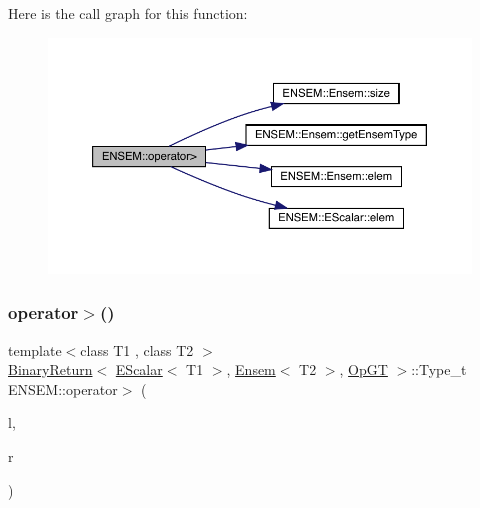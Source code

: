 Here is the call graph for this function\+:\nopagebreak
\begin{figure}[H]
\begin{center}
\leavevmode
\includegraphics[width=350pt]{d1/d9e/group__eensem_gadb5372b36c1e21728de4e36358b59440_cgraph}
\end{center}
\end{figure}
\mbox{\label{group__eensem_gaf81a55e62404e9b802fbb90aaee678ea}} 
\subsubsection{\texorpdfstring{operator$>$()}{operator>()}\hspace{0.1cm}{\footnotesize\ttfamily [3/3]}}
{\footnotesize\ttfamily template$<$class T1 , class T2 $>$ \\
\mbox{\hyperlink{structENSEM_1_1BinaryReturn}{Binary\+Return}}$<$ \mbox{\hyperlink{classENSEM_1_1EScalar}{E\+Scalar}}$<$ T1 $>$, \mbox{\hyperlink{classENSEM_1_1Ensem}{Ensem}}$<$ T2 $>$, \mbox{\hyperlink{structENSEM_1_1OpGT}{Op\+GT}} $>$\+::Type\+\_\+t E\+N\+S\+E\+M\+::operator$>$ (\begin{DoxyParamCaption}\item[{const \mbox{\hyperlink{classENSEM_1_1EScalar}{E\+Scalar}}$<$ T1 $>$ \&}]{l,  }\item[{const \mbox{\hyperlink{classENSEM_1_1Ensem}{Ensem}}$<$ T2 $>$ \&}]{r }\end{DoxyParamCaption})\hspace{0.3cm}{\ttfamily [inline]}}

